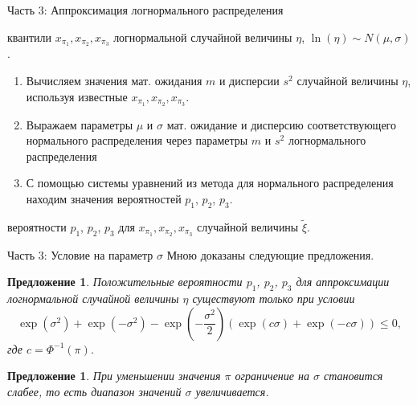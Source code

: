 \documentclass[ucs, notheorems, handout]{beamer}
\newtheorem{proposition2}[theorem]{Предложение}
\newenvironment{pr1}{\par\noindent{\bf Дано:}}{}
\newenvironment{pr3}{\par\noindent{\bf Результат:}}{}
\begin{document}
	
	\begin{frame}{Часть 3: Аппроксимация логнормального распределения}
			\begin{pr1}
				квантили $x_{\pi_{1}}, x_{\pi_{2}}, x_{\pi_{3}}$ логнормальной случайной величины $\eta$, $\ln(\eta) \sim N(\mu, \sigma)$.
			\end{pr1}
		
		\bigskip
		
			\begin{enumerate}
				\item Вычисляем значения мат. ожидания $m$ и дисперсии $s^{2}$ случайной величины $\eta$, используя известные $x_{\pi_{1}}, x_{\pi_{2}}, x_{\pi_{3}}$.
				\item Выражаем параметры $\mu$ и $\sigma$ мат. ожидание и дисперсию соответствующего нормального распределения через параметры $m$ и $s^{2}$ логнормального распределения
				\item С помощью системы уравнений из метода для нормального распределения находим значения вероятностей $p_{1}$, $p_{2}$, $p_{3}$.
			\end{enumerate}
		\bigskip
			\begin{pr3}\end{pr3} вероятности $p_{1}$, $p_{2}$, $p_{3}$ для $x_{\pi_{1}}, x_{\pi_{2}}, x_{\pi_{3}}$ случайной величины $\tilde{\xi}$.
		
	\end{frame}

\begin{frame}{Часть 3: Условие на параметр $\sigma$}
	Мною доказаны следующие предложения.
		\begin{proposition2}
		Положительные вероятности $p_{1}$, $p_{2}$, $p_{3}$ для аппроксимации логнормальной случайной величины $\eta$ существуют только при условии \[\exp(\sigma^{2})+\exp(-\sigma^{2})-\exp\left( -\dfrac{\sigma^{2}}{2}\right) 
		(\exp(c\sigma)+\exp(-c\sigma))\leq 0,\] 
		где $c = \Phi^{-1}(\pi)$.
	\end{proposition2}
	
	\begin{proposition2}
		При уменьшении значения $\pi$ ограничение на $\sigma$ становится слабее, то есть диапазон значений $\sigma$ увеличивается.
	\end{proposition2}

\end{frame}
\end{document}
